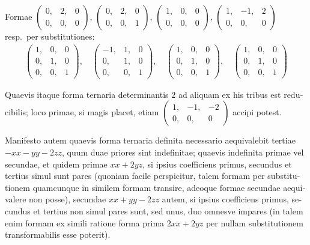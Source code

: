 \documentclass[12pt,a4paper]{article}
\theoremstyle{plain}
\theoremstyle{definition}
\theoremstyle{remark}
\begin{document}
\begin{otherlanguage}{latin}
Formae $\begin{pmatrix} 0, & 2, & 0 \\ 0, & 0, & 0 \end{pmatrix}$, $\begin{pmatrix} 0, & 2, & 0 \\ 0, & 0, & 1 \end{pmatrix}$, $\begin{pmatrix} 1, & 0, & 0 \\ 0, & 0, & 0 \end{pmatrix}$, $\begin{pmatrix} 1, & -1, & 2 \\ 0, & 0, & 0 \end{pmatrix}$ resp.\ per substitutiones:
\begin{gather*}
\begin{pmatrix} 1, & 0, & 0 \\ 0, & 1, & 0 \\ 0, & 0, & 1 \end{pmatrix}, \quad
\begin{pmatrix} -1, & 1, & 0 \\ 0, & 1, & 0 \\ 0, & 0, & 1 \end{pmatrix}, \quad
\begin{pmatrix} 1, & 0, & 0 \\ 0, & 1, & 0 \\ 0, & 0, & 1 \end{pmatrix}, \quad
\begin{pmatrix} 1, & 0, & 0 \\ 0, & 1, & 0 \\ 0, & 0, & 1 \end{pmatrix}
\end{gather*}

Quaevis itaque forma ternaria determinantis $2$ ad aliquam ex his tribus est reducibilis; loco primae, si magis placet, etiam $\begin{pmatrix} 1, & -1, & -2 \\ 0, & 0, & 0 \end{pmatrix}$ accipi potest.

Manifesto autem quaevis forma ternaria definita necessario aequivalebit tertiae $-xx - yy - 2zz$, quum duae priores sint indefinitae; quaevis indefinita primae vel secundae, et quidem primae $xx + 2yz$, si ipsius coefficiens primus, secundus et tertius simul sunt pares (quoniam facile perspicitur, talem formam per substitutionem quamcunque in similem formam transire, adeoque formae secundae aequivalere non posse), secundae $xx + yy - 2zz$ autem, si ipsius coefficiens primus, secundus et tertius non simul pares sunt, sed unus, duo omnesve impares (in talem enim formam ex simili ratione forma prima $2xx + 2yz$ per nullam substitutionem transformabilis esse poterit).

\end{otherlanguage}
\end{document}
